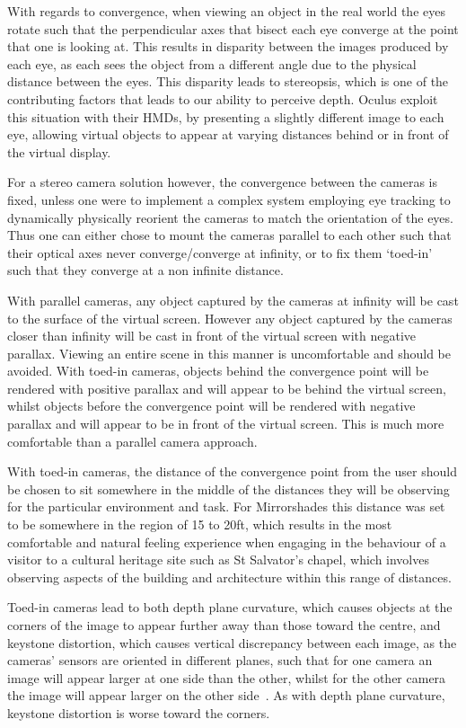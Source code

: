 With regards to convergence, when viewing an object in the real world the eyes rotate such that the perpendicular axes that bisect each eye converge at the point that one is looking at. This results in disparity between the images produced by each eye, as each sees the object from a different angle due to the physical distance between the eyes. This disparity leads to stereopsis, which is one of the contributing factors that leads to our ability to perceive depth. Oculus exploit this situation with their HMDs, by presenting a slightly different image to each eye, allowing virtual objects to appear at varying distances behind or in front of the virtual display.

For a stereo camera solution however, the convergence between the cameras is fixed, unless one were to implement a complex system employing eye tracking to dynamically physically reorient the cameras to match the orientation of the eyes. Thus one can either chose to mount the cameras parallel to each other such that their optical axes never converge/converge at infinity, or to fix them `toed-in' such that they converge at a non infinite distance.

With parallel cameras, any object captured by the cameras at infinity will be cast to the surface of the virtual screen. However any object captured by the cameras closer than infinity will be cast in front of the virtual screen with negative parallax. Viewing an entire scene in this manner is uncomfortable and should be avoided. With toed-in cameras, objects behind the convergence point will be rendered with positive parallax and will appear to be behind the virtual screen, whilst objects before the convergence point will be rendered with negative parallax and will appear to be in front of the virtual screen. This is much more comfortable than a parallel camera approach.

With toed-in cameras, the distance of the convergence point from the user should be chosen to sit somewhere in the middle of the distances they will be observing for the particular environment and task. For Mirrorshades this distance was set to be somewhere in the region of 15 to 20ft, which results in the most comfortable and natural feeling experience when engaging in the behaviour of a visitor to a cultural heritage site such as St Salvator's chapel, which involves observing aspects of the building and architecture within this range of distances.

Toed-in cameras lead to both depth plane curvature, which causes objects at the corners of the image to appear further away than those toward the centre, and keystone distortion, which causes vertical discrepancy between each image, as the cameras' sensors are oriented in different planes, such that for one camera an image will appear larger at one side than the other, whilst for the other camera the image will appear larger on the other side~\cite{Woods1993}. As with depth plane curvature, keystone distortion is worse toward the corners.

